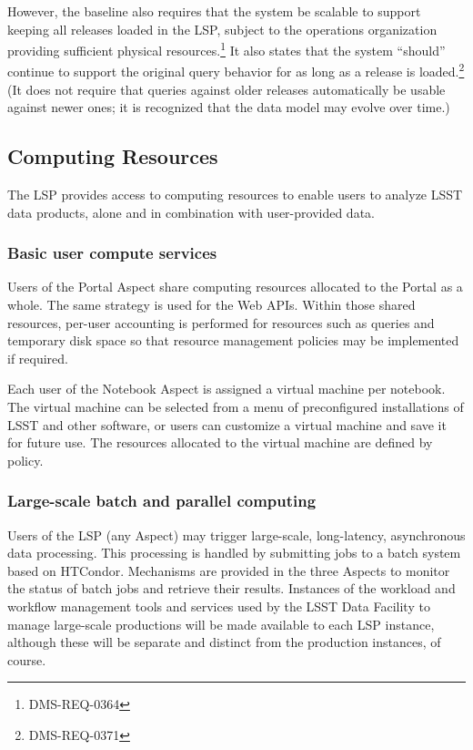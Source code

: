 However, the baseline also requires that the system be scalable to support
keeping all releases loaded in the LSP, subject to the operations organization
providing sufficient physical resources.\footnote{DMS-REQ-0364}
It also states that the system ``should'' continue to support the original
query behavior for as long as a release is loaded.\footnote{DMS-REQ-0371}
(It does not require that queries against older releases automatically be
usable against newer ones; it is recognized that the data model may evolve
over time.)

\subsection{Computing Resources}\label{computing-resources}

The LSP provides access to computing resources to enable users to analyze
LSST data products, alone and in combination with user-provided data.

\subsubsection{Basic user compute services}\label{basic-user-compute-services}

Users of the Portal Aspect share computing resources allocated to the Portal as
a whole.  The same strategy is used for the Web APIs.  Within those shared
resources, per-user accounting is performed for resources such as queries and
temporary disk space so that resource management policies may be implemented
if required.

Each user of the Notebook Aspect is assigned a virtual machine per notebook.
The virtual machine can be selected from a menu of preconfigured installations
of LSST and other software, or users can customize a virtual machine and save
it for future use.  The resources allocated to the virtual machine are
defined by policy.

\subsubsection{Large-scale batch and parallel computing}\label{large-scale-batch-and-parallel-computing}

Users of the LSP (any Aspect) may trigger large-scale, long-latency,
asynchronous data processing.  This processing is handled by submitting jobs to
a batch system based on HTCondor.  Mechanisms are provided in the three Aspects
to monitor the status of batch jobs and retrieve their results.  Instances of
the workload and workflow management tools and services used by the LSST Data
Facility to manage large-scale productions will be made available to each LSP
instance, although these will be separate and distinct from the production
instances, of course.

